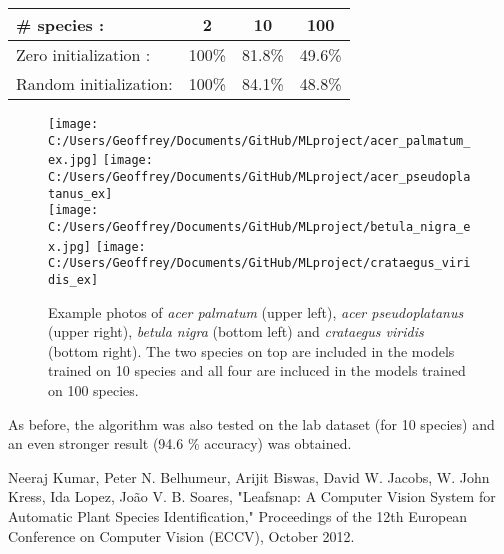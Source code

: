 \documentclass[12pt]{article}
\begin{document}
\begin{center}
\begin{tabular}{|l|c|c|c|}
 \hline
 \# species : & 2 & 10 & 100\\
 \hline
 Zero initialization : & 100\% & 81.8\% & 49.6\%\\
 Random initialization: & 100\% & 84.1\% & 48.8\%\\
 \hline
\end{tabular}
\end{center}

\begin{figure}
\texttt{[image: C:/Users/Geoffrey/Documents/GitHub/MLproject/acer\_palmatum\_ex.jpg]} \texttt{[image: C:/Users/Geoffrey/Documents/GitHub/MLproject/acer\_pseudoplatanus\_ex]} \\ \texttt{[image: C:/Users/Geoffrey/Documents/GitHub/MLproject/betula\_nigra\_ex.jpg]} \texttt{[image: C:/Users/Geoffrey/Documents/GitHub/MLproject/crataegus\_viridis\_ex]}
\caption{\label{fig:exphotosmulti} Example photos of \textit{acer palmatum} (upper left), \textit{acer pseudoplatanus} (upper right), \textit{betula nigra} (bottom left) and \textit{crataegus viridis} (bottom right). The two species on top are included in the models trained on 10 species and all four are incluced in the models trained on 100 species.}
\end{figure}

As before, the algorithm was also tested on the lab dataset (for 10 species) and an even stronger result (94.6 \% accuracy) was obtained.

\begin{thebibliography}{99}
 Neeraj Kumar, Peter N. Belhumeur, Arijit Biswas, David W. Jacobs, W. John Kress, Ida Lopez, Jo\~{a}o V. B. Soares, "Leafsnap: A Computer Vision System for Automatic Plant Species Identification," Proceedings of the 12th European Conference on Computer Vision (ECCV), October 2012.
\end{thebibliography}
\end{document}
